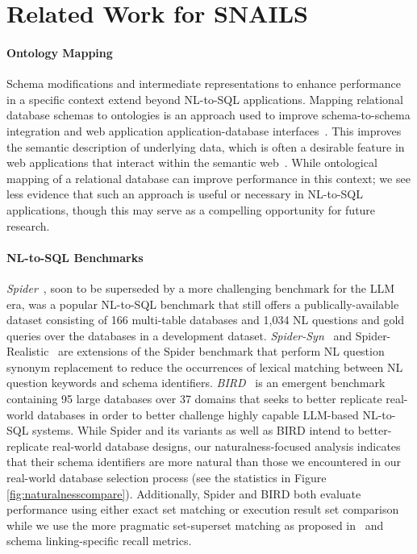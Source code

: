 
\clearpage



\section{Related Work for SNAILS}



\paragraph{\textbf{Ontology Mapping}}
Schema modifications and intermediate representations to enhance performance in a specific context extend beyond NL-to-SQL applications.
Mapping relational database schemas to ontologies is an approach used to improve schema-to-schema integration and web application application-database interfaces~\cite{4061430}.
This improves the semantic description of underlying data, which is often a desirable feature in web applications that interact within the semantic web~\cite{7396620}.
While ontological mapping of a relational database can improve performance in this context; we see less evidence that such an approach is useful or necessary in NL-to-SQL applications, though this may serve as a compelling opportunity for future research.

\paragraph{\textbf{NL-to-SQL Benchmarks}}
\emph{Spider}~\cite{Yu&al.18c}, soon to be superseded by a more challenging benchmark for the LLM era, was a popular NL-to-SQL benchmark that still offers a publically-available dataset consisting of 166 multi-table databases and 1,034 NL questions and gold queries over the databases in a development dataset. 
\emph{Spider-Syn}~\cite{gan-etal-2021-towards} and Spider-Realistic~\cite{gan-etal-2021-towards} are extensions of the Spider benchmark that perform NL question synonym replacement to reduce the occurrences of lexical matching between NL question keywords and schema identifiers.
\emph{BIRD}~\cite{li2023llm} is an emergent benchmark containing 95 large databases over 37 domains that seeks to better replicate real-world databases in order to better challenge highly capable LLM-based NL-to-SQL systems.
While Spider and its variants as well as BIRD intend to better-replicate real-world database designs, our naturalness-focused analysis indicates that their schema identifiers are more natural than those we encountered in our real-world database selection process (see the statistics in Figure \ref{fig:naturalnesscompare}).
Additionally, Spider and BIRD both evaluate performance using either exact set matching or execution result set comparison while we use the more pragmatic set-superset matching as proposed in~\cite{floratou2024nl2sql} and schema linking-specific recall metrics.

